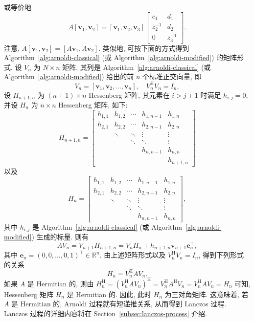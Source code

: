{或等价地}
\[
A[\bm v_1,\bm v_2]=[\bm v_1,\bm v_2,\bm v_3]
\begin{bmatrix}c_1&d_1\\z_2^{-1}&d_2\\0&z_3^{-1}\end{bmatrix}.
\]
{注意, $A[\bm v_1,\bm v_2]=[A\bm v_1,A\bm v_2]$. 类似地, 可按下面的方式得到 Algorithm~\ref{alg:arnoldi-classical} (或 Algorithm~\ref{alg:arnoldi-modified}) 的矩阵形式.}
{设 $V_n$ 为 $N\times n$ 矩阵, 其列是 Algorithm~\ref{alg:arnoldi-classical} (或 Algorithm~\ref{alg:arnoldi-modified}) 给出的前 $n$ 个标准正交向量, 即}
\[V_n=[\bm v_1,\bm v_2,\ldots,\bm v_n],\quad V_n^{\mathrm H}V_n=I_n,\]
{设 $H_{n+1,n}$ 为 $(n+1)\times n$ Hessenberg 矩阵, 其元素在 $i>j+1$ 时满足 $h_{i,j}=0$, 并设 $H_n$ 为 $n\times n$ Hessenberg 矩阵, 如下:}
\[
H_{n+1,n}=\begin{bmatrix}
h_{1,1}&h_{1,2}&\cdots&h_{1,n-1}&h_{1,n}\\
h_{2,1}&h_{2,2}&\cdots&h_{2,n-1}&h_{2,n}\\
&\ddots&\ddots&\vdots&\vdots\\
&&\ddots&\ddots&\vdots\\
&&&h_{n,n-1}&h_{n,n}\\
&&&&h_{n+1,n}
\end{bmatrix}
\]
{以及}
\[
H_n=\begin{bmatrix}
h_{1,1}&h_{1,2}&\cdots&h_{1,n-1}&h_{1,n}\\
h_{2,1}&h_{2,2}&\cdots&h_{2,n-1}&h_{2,n}\\
&\ddots&\ddots&\vdots&\vdots\\
&&\ddots&\ddots&\vdots\\
&&&h_{n,n-1}&h_{n,n}
\end{bmatrix},
\]
{其中 $h_{i,j}$ 是 Algorithm~\ref{alg:arnoldi-classical} (或 Algorithm~\ref{alg:arnoldi-modified}) 生成的标量. 则有}
\begin{equation}\label{eq:arnoldi-matrix-relation}\label{srcpage:printed-25}
AV_n=V_{n+1}H_{n+1,n}=V_nH_n+h_{n+1,n}\bm v_{n+1}\bm e_n^\top,
\end{equation}
{其中 $\bm e_n=(0,0,\ldots,0,1)^\top\in\mathbb R^n$. 由上述矩阵形式以及 $V_n^{\mathrm H}V_n=I_n$, 得到下列形式的关系}
\begin{equation}\label{eq:arnoldi-projected-matrix}H_n=V_n^{\mathrm H}AV_n.\end{equation}
{如果 $A$ 是 Hermitian 的, 则由 $H_n^{\mathrm H}=(V_n^{\mathrm H}AV_n)^{\mathrm H}=V_n^{\mathrm H}A^{\mathrm H}V_n=V_n^{\mathrm H}AV_n=H_n$ 可知, Hessenberg 矩阵 $H_n$ 是 Hermitian 的. 因此, 此时 $H_n$ 为三对角矩阵. 这意味着, 若 $A$ 是 Hermitian 的, Arnoldi 过程就有短递推关系, 从而得到 Lanczos 过程. Lanczos 过程的详细内容将在 Section~\ref{subsec:lanczos-process} 介绍.}
